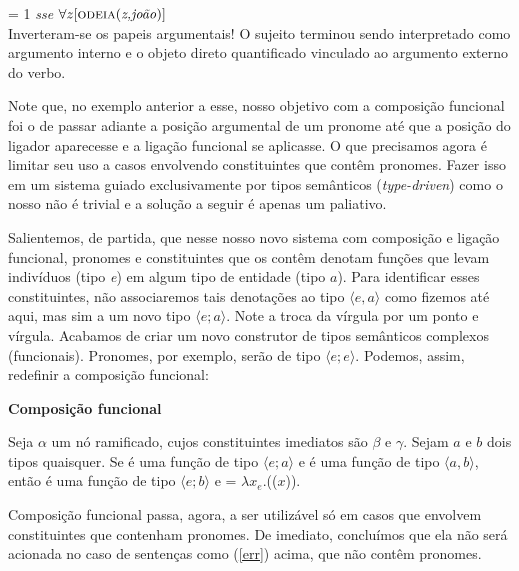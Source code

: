 \n {} = 1 \textit{sse} $\forall z [\text{\textsc{odeia}(\textit{z,joão})}]$ \\

\n Inverteram-se os papeis argumentais! O sujeito terminou sendo interpretado como argumento interno e o objeto direto quantificado vinculado ao argumento externo do verbo.  

Note que, no exemplo anterior a esse, nosso objetivo com a composição funcional foi o de passar adiante a posição argumental de um pronome até que a posição do ligador aparecesse e a ligação funcional se aplicasse. O que precisamos agora é limitar seu uso a casos envolvendo constituintes que contêm pronomes. Fazer isso em um sistema guiado exclusivamente por tipos semânticos (\textit{type-driven}) como o nosso não é trivial e a solução a seguir é apenas um paliativo. 

Salientemos, de partida, que nesse nosso novo sistema com composição e ligação funcional, pronomes e constituintes que os contêm denotam funções que levam indivíduos (tipo \textit{e}) em algum tipo de entidade (tipo $a$). Para identificar esses constituintes, não associaremos tais denotações ao tipo $\langle e,a \rangle$ como fizemos até aqui, mas sim a um novo tipo  $\langle e;a \rangle$. Note a troca da vírgula por um ponto e vírgula. Acabamos de criar um novo construtor de tipos semânticos complexos (funcionais). Pronomes, por exemplo, serão de tipo $\langle e;e\rangle$. Podemos, assim, redefinir a composição funcional:\\

\begin{tcolorbox}[boxrule=0pt,sharp corners]

\noindent \textbf{Composição funcional}

\n Seja $\alpha$ um nó ramificado, cujos constituintes imediatos
são $\beta$ e $\gamma$. Sejam $a$ e $b$ dois tipos quaisquer. Se \den{$\beta$} é uma função de
tipo $\langle e;a \rangle$ e \den{$\gamma$} é uma função de
tipo $\langle a,b \rangle$, então
\den{$\alpha$} é uma função de tipo $\langle e;b \rangle$ e \den{$\alpha$} = $\lambda x_{e}.$\den{$\gamma$}(\den{$\beta$}($x$)).

\end{tcolorbox}

\bigskip

\n Composição funcional passa, agora, a ser utilizável só em casos que envolvem constituintes que contenham pronomes. De imediato, concluímos que ela não será acionada no caso de sentenças como (\ref{err}) acima, que não contêm pronomes. 

